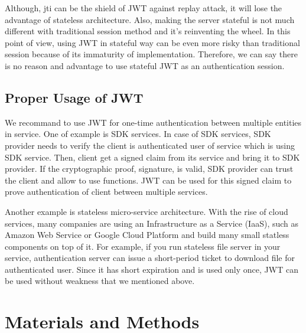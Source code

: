 \documentclass[journal,article,submit,moreauthors,pdftex,10pt,a4paper]{mdpi}
\begin{document}
Although, jti can be the shield of JWT against replay attack, it will lose the advantage of stateless architecture. Also, making the server stateful is not much different with traditional session method and it's reinventing the wheel. In this point of view, using JWT in stateful way can be even more risky than traditional session because of its immaturity of implementation.
Therefore, we can say there is no reason and advantage to use stateful JWT as an authentication session.

\subsection{Proper Usage of JWT}
We recommand to use JWT for one-time authentication between multiple entities in service. One of example is SDK services. In case of SDK services, SDK provider needs to verify the client is authenticated user of service which is using SDK service. Then, client get a signed claim from its service and bring it to SDK provider. If the cryptographic proof, signature, is valid, SDK provider can trust the client and allow to use functions. JWT can be used for this signed claim to prove authentication of client between multiple services.

Another example is stateless micro-service architecture. With the rise of cloud services, many companies are using an Infrastructure as a Service (IaaS), such as Amazon Web Service or Google Cloud Platform and build many small statless components on top of it. For example, if you run stateless file server in your service, authentication server can issue a short-period ticket to download file for authenticated user. Since it has short expiration and is used only once, JWT can be used without weakness that we mentioned above.


\section{Materials and Methods}

\end{document}

